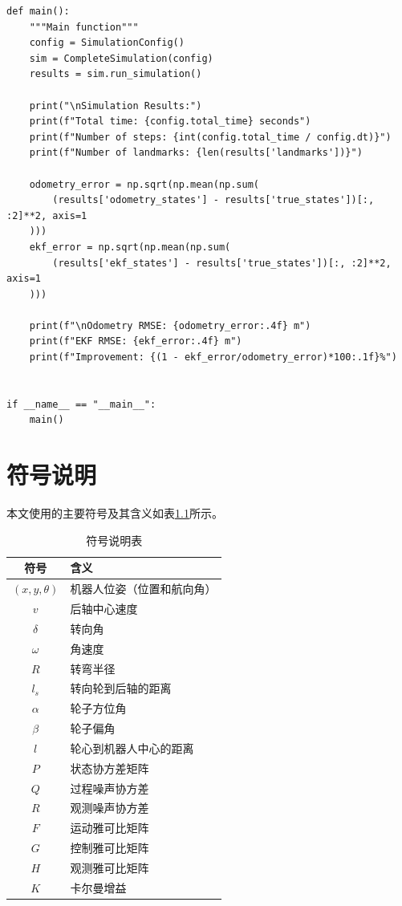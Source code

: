 \documentclass[12pt,a4paper]{report}
\begin{document}
\begin{lstlisting}[caption={Complete Simulation System (complete\_simulation.py)}]
def main():
    """Main function"""
    config = SimulationConfig()
    sim = CompleteSimulation(config)
    results = sim.run_simulation()
    
    print("\nSimulation Results:")
    print(f"Total time: {config.total_time} seconds")
    print(f"Number of steps: {int(config.total_time / config.dt)}")
    print(f"Number of landmarks: {len(results['landmarks'])}")
    
    odometry_error = np.sqrt(np.mean(np.sum(
        (results['odometry_states'] - results['true_states'])[:, :2]**2, axis=1
    )))
    ekf_error = np.sqrt(np.mean(np.sum(
        (results['ekf_states'] - results['true_states'])[:, :2]**2, axis=1
    )))
    
    print(f"\nOdometry RMSE: {odometry_error:.4f} m")
    print(f"EKF RMSE: {ekf_error:.4f} m")
    print(f"Improvement: {(1 - ekf_error/odometry_error)*100:.1f}%")


if __name__ == "__main__":
    main()
\end{lstlisting}

\chapter{符号说明}

本文使用的主要符号及其含义如表\ref{tab:symbols}所示。

\begin{table}[H]
\centering
\caption{符号说明表}
\label{tab:symbols}
\begin{tabular}{cl}
\toprule
\textbf{符号} & \textbf{含义} \\
\midrule
$(x, y, \theta)$ & 机器人位姿（位置和航向角） \\
$v$ & 后轴中心速度 \\
$\delta$ & 转向角 \\
$\omega$ & 角速度 \\
$R$ & 转弯半径 \\
$l_s$ & 转向轮到后轴的距离 \\
$\alpha$ & 轮子方位角 \\
$\beta$ & 轮子偏角 \\
$l$ & 轮心到机器人中心的距离 \\
$P$ & 状态协方差矩阵 \\
$Q$ & 过程噪声协方差 \\
$R$ & 观测噪声协方差 \\
$F$ & 运动雅可比矩阵 \\
$G$ & 控制雅可比矩阵 \\
$H$ & 观测雅可比矩阵 \\
$K$ & 卡尔曼增益 \\
\bottomrule
\end{tabular}
\end{table}
\end{document}
